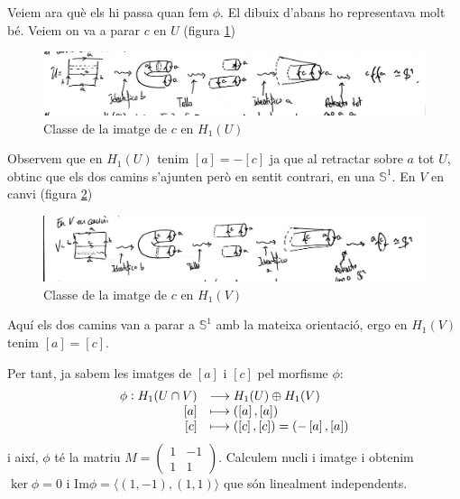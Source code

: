 \documentclass[../main.tex]{subfiles}
\begin{document}
\begin{sol}
Veiem ara què els hi passa quan fem $\phi$. El dibuix d'abans ho representava molt bé. Veiem on va a parar $c$ en $U$ (figura \ref{fig:kleinmv3})
\begin{figure}[H]
    \centering
    \includegraphics[scale = 0.25]{pictures/kleinmv3.jpeg}
    \caption{Classe de la imatge de $c$ en $H_1(U)$}
    \label{fig:kleinmv3}
\end{figure}
Observem que en $H_1(U)$ tenim $[a] = -[c]$ ja que al retractar sobre $a$ tot $U$, obtinc que els dos camins s'ajunten però en sentit contrari, en una $\mathbb{S}^1$. En $V$ en canvi (figura \ref{fig:kleinmv4})
\begin{figure}[H]
    \centering
    \includegraphics[scale = 0.25]{pictures/kleinmv4.jpeg}
    \caption{Classe de la imatge de $c$ en $H_1(V)$}
    \label{fig:kleinmv4}
\end{figure}
Aquí els dos camins van a parar a $\mathbb{S}^1$ amb la mateixa orientació, ergo en $H_1(V)$ tenim $[a] = [c]$.

Per tant, ja sabem les imatges de $[a]$ i $[c]$ pel morfisme $\phi$:
\begin{equation}
    \notag
    \begin{array}{rl}
        \phi:H_1(U\cap V) & \longrightarrow H_1(U)\oplus H_1(V) \\
        \left[a\right] & \longmapsto (\left[a\right],\left[a\right])\\
        \left[c\right] & \longmapsto (\left[c\right],\left[c\right]) = (-\left[a\right],\left[a\right])
    \end{array}
\end{equation}
i així, $\phi$ té la matriu $M = \left(\begin{smallmatrix}1&-1\\1&1\end{smallmatrix}\right)$. Calculem nucli i imatge i obtenim $\ker\phi = 0$ i $\mathrm{Im}\phi = \langle(1,-1),(1,1)\rangle$ que són linealment independents.


\end{sol}
\end{document}
